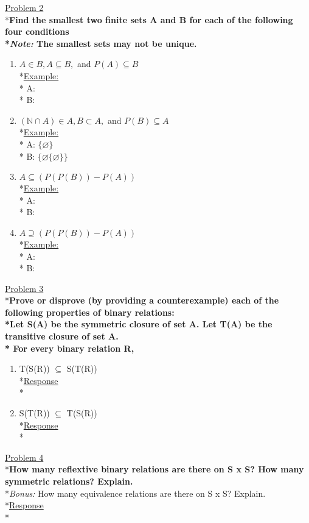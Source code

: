 \documentclass[12pt]{article}
\begin{document}
\medskip
\uline{Problem 2}
\\*\textbf{Find the smallest two finite sets A and B for each of the following four conditions
\\*\textit{Note:} The smallest sets may not be unique.}
\begin{enumerate}
\item $A \in B, A \subseteq B,$ and $P(A) \subseteq B$
\smallskip
\\*\uline{Example:}
\\* A: 
\\* B: 
\smallskip
\item $(\mathbb{N} \cap A) \in A, B \subset A,$ and $P(B) \subseteq A$
\smallskip
\\*\uline{Example:}
\\* A: $\{\varnothing\}$
\\* B: $\{\varnothing \{\varnothing\}\}$
\smallskip
\item $A \subseteq (P(P(B)) - P(A))$
\smallskip
\\*\uline{Example:}
\\* A: 
\\* B: 
\smallskip
\item $A \supseteq (P(P(B))-P(A))$
\smallskip
\\*\uline{Example:}
\\* A: 
\\* B: 
\smallskip
\end{enumerate}
\medskip
\uline{Problem 3}
\\*\textbf{Prove or disprove (by providing a counterexample) each of the following properties of binary relations:
\\*Let S(A) be the symmetric closure of set A. Let T(A) be the transitive closure of set A.
\\* For every binary relation R,}
\begin{enumerate}
\item T(S(R)) $\subseteq$ S(T(R))
\smallskip
\\*\uline{Response}
\\*
\item S(T(R)) $\subseteq$ T(S(R))
\smallskip
\\*\uline{Response}
\\*
\end{enumerate}
\medskip
\uline{Problem 4}
\\*\textbf{How many reflextive binary relations are there on S x S? How many symmetric relations? Explain.}
\\*\textit{Bonus:} How many equivalence relations are there on S x S? Explain.
\smallskip
\\*\uline{Response}
\\*
\end{document}
